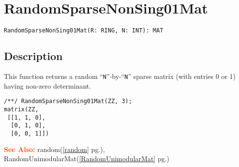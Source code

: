 \documentclass[a4paper]{mybook}
\newenvironment{command}{}{} %
\newcommand\SeeAlso{\par\textcolor{OrangeRed}{\textbf{\large See Also: }}}
\begin{document}
\section{RandomSparseNonSing01Mat}
\label{RandomSparseNonSing01Mat}
\begin{command} %


\begin{Verbatim}[label=syntax, rulecolor=\color{MidnightBlue},
frame=single]
RandomSparseNonSing01Mat(R: RING, N: INT): MAT
\end{Verbatim}


\subsection*{Description}

This function returns a random ``\verb&N&''-by-``\verb&N&'' sparse matrix (with entries
0 or 1) having non-zero determinant.
\begin{Verbatim}[label=example, rulecolor=\color{PineGreen}, frame=single]
/**/ RandomSparseNonSing01Mat(ZZ, 3);
matrix(ZZ,
 [[1, 1, 0],
  [0, 1, 0],
  [0, 0, 1]])
\end{Verbatim}


\SeeAlso %
  random(\ref{random} pg.\pageref{random}), 
    RandomUnimodularMat(\ref{RandomUnimodularMat} pg.\pageref{RandomUnimodularMat})
\end{command} %
\end{document}
